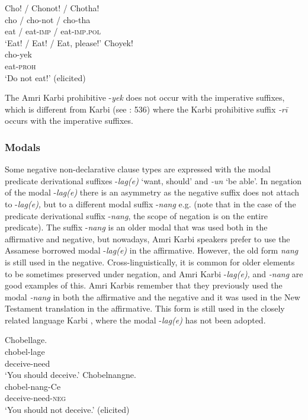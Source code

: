 \documentclass[output=paper,colorlinks,citecolor=brown]{langscibook}
\begin{document}
\ea\label{ex:amr:12}
    \ea\label{ex:amr:12a} Cho! / Chonot! / Chotha!  \\ 
        \gll cho / cho-not / cho-tha \\
              eat / eat-\textsc{imp} / eat-\textsc{imp}.\textsc{pol} \\
        \glt  ‘Eat! / Eat! / Eat, please!’ 
    \ex\label{ex:amr:12b}Choyek! \\
        \gll cho-yek \\
              eat-\textsc{proh} \\
        \glt ‘Do not eat!’ (elicited)
    \z
\z 

The Amri Karbi prohibitive -\textit{yek} does not occur with the imperative suffixes, which is different from Karbi (see \citealt{Konnerth2014}: 536) where the Karbi prohibitive suffix \textit{{}-rī} occurs with the imperative suffixes. 

\subsubsection{Modals}\label{sec:amr:2.2.2}
Some negative non-declarative clause types are expressed with the modal predicate derivational suffixes -\textit{lag(e)} ‘want, should’ and \textit{{}-un} ‘be able’. In negation of the modal -\textit{lag(e)} there is an asymmetry as the negative suffix does not attach to -\textit{lag(e),} but to a different modal suffix -\textit{nang} e.g.  (note that in the case of the predicate derivational suffix -\textit{nang}, the scope of negation is on the entire predicate). The suffix -\textit{nang} is an older modal that was used both in the affirmative and negative, but nowadays, Amri Karbi speakers prefer to use the Assamese borrowed modal -\textit{lag(e)} in the affirmative. However, the old form \textit{nang} is still used in the negative. Cross-linguistically, it is common for older elements to be sometimes preserved under negation, and Amri Karbi -\textit{lag(e),} and \textit{-nang} are good examples of this. Amri Karbis remember that they previously used the modal \textit{-nang} in both the affirmative and the negative and it was used in the New Testament translation \cite{AmriNT} in the affirmative. This form is still used in the closely related language Karbi \citep[356]{Konnerth2014}, where the modal -\textit{lag(e)} has not been adopted. 

\ea\label{ex:amr:13}
    \ea\label{ex:amr:13a} Chobellage.  \\ 
        \gll chobel-lage \\
              deceive-need \\
        \glt ‘You should deceive.’ 
    \ex\label{ex:amr:13b}Chobelnangne. \\
        \gll chobel-nang-Ce\\
              deceive-need-\textsc{neg} \\
        \glt ‘You should not deceive.’ (elicited)
    \z
\z
\end{document}
